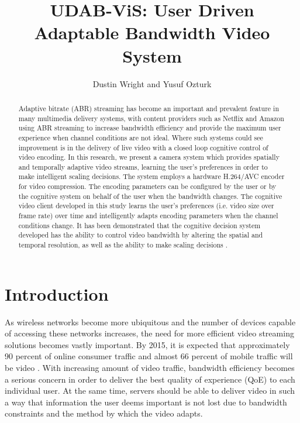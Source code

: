 \documentclass[preprint, 12pt]{elsarticle}
\begin{document}
\title{UDAB-ViS: User Driven Adaptable Bandwidth Video System}
\author{Dustin Wright and Yusuf Ozturk}
\maketitle


\begin{abstract}
Adaptive bitrate (ABR) streaming has become an important and prevalent feature in many multimedia delivery systems, with content providers such as Netflix and Amazon using ABR streaming to increase bandwidth efficiency and provide the maximum user experience when channel conditions are not ideal. Where such systems could see improvement is in the delivery of live video with a closed loop cognitive control of video encoding. In this research, we present a camera system which provides spatially and temporally adaptive video streams, learning the user’s preferences in order to make intelligent scaling decisions. The system employs a hardware H.264/AVC encoder for video compression. The encoding parameters can be configured by the user or by the cognitive system on behalf of the user when the bandwidth changes. The cognitive video client  developed in this study learns the user’s preferences (i.e. video size over frame rate) over time and intelligently adapts  encoding parameters when the channel conditions change. It has been demonstrated that the cognitive decision system developed has  the ability to control video bandwidth by altering the spatial and temporal resolution, as well as the ability to make scaling decisions .
\end{abstract}

\section{Introduction}
\label{sec:Intro}

As wireless networks become more ubiquitous and the number of devices capable of accessing these networks increases, the need for more efficient video streaming solutions becomes vastly important. By 2015, it is expected that approximately 90 percent of online consumer traffic and almost 66 percent of mobile traffic will be video \cite{HASQoE}. With increasing amount of video traffic, bandwidth efficiency becomes a serious concern in order to deliver the best quality of experience (QoE) to each individual user. At the same time, servers should be able to deliver video in such a way that information the user deems important is not lost due to bandwidth constraints and the method by which the video adapts.
\end{document}
